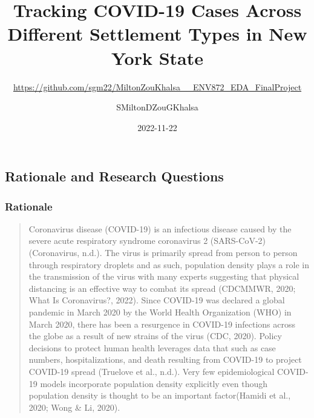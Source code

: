 \documentclass[
  12pt,
]{article}
\title{Tracking COVID-19 Cases Across Different Settlement Types in New
York State}
\subtitle{\url{https://github.com/sgm22/MiltonZouKhalsa__ENV872_EDA_FinalProject}}
\author{SMiltonDZouGKhalsa}
\date{2022-11-22}
\begin{document}
\maketitle

{
\setcounter{tocdepth}{2}
\tableofcontents
}
\newpage
\tableofcontents 
\newpage
\listoftables 
\newpage
\listoffigures 
\newpage

\hypertarget{rationale-and-research-questions}{%
\subsection{Rationale and Research
Questions}\label{rationale-and-research-questions}}

\hypertarget{rationale}{%
\subsubsection{Rationale}\label{rationale}}

\begin{quote}
Coronavirus disease (COVID-19) is an infectious disease caused by the
severe acute respiratory syndrome coronavirus 2 (SARS-CoV-2)
(Coronavirus, n.d.). The virus is primarily spread from person to person
through respiratory droplets and as such, population density plays a
role in the transmission of the virus with many experts suggesting that
physical distancing is an effective way to combat its spread (CDCMMWR,
2020; What Is Coronavirus?, 2022). Since COVID-19 was declared a global
pandemic in March 2020 by the World Health Organization (WHO) in March
2020, there has been a resurgence in COVID-19 infections across the
globe as a result of new strains of the virus (CDC, 2020). Policy
decisions to protect human health leverages data that such as case
numbers, hospitalizations, and death resulting from COVID-19 to project
COVID-19 spread (Truelove et al., n.d.). Very few epidemiological
COVID-19 models incorporate population density explicitly even though
population density is thought to be an important factor(Hamidi et al.,
2020; Wong \& Li, 2020).
\end{quote}
\end{document}
